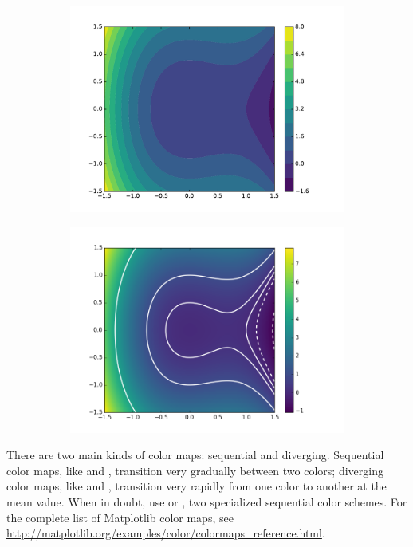 \begin{figure}[H]
\begin{subfigure}{.495\textwidth}
    \includegraphics[width=\linewidth]{figures/contour_2.pdf}
\end{subfigure}
%
\begin{subfigure}{.495\textwidth}
    \centering
    \includegraphics[width=\linewidth]{figures/heatmap_2.png}
\end{subfigure}
\end{figure}

There are two main kinds of color maps: sequential and diverging.
Sequential color maps, like  and , transition very gradually between two colors; diverging color maps, like  and , transition very rapidly from one color to another at the mean value.
When in doubt, use  or , two specialized sequential color schemes.
For the complete list of Matplotlib color maps, see \url{http://matplotlib.org/examples/color/colormaps_reference.html}.

